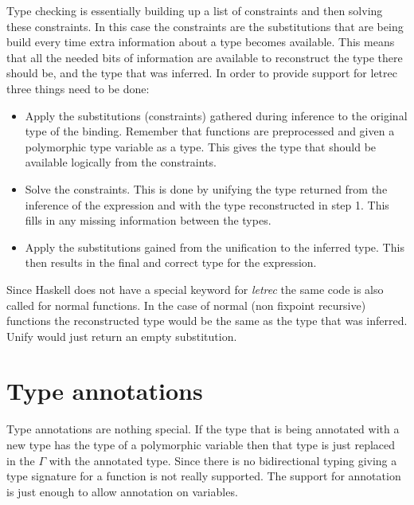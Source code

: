 Type checking is essentially building up a list of constraints and then solving these constraints. In this case the constraints are the substitutions that are being build every time extra information about a type becomes available.
This means that all the needed bits of information are available to reconstruct the type there should be, and the type that was inferred. In order to provide support for letrec three things need to be done:

\begin{itemize}
\item Apply the substitutions (constraints) gathered during inference to the original type of the binding. Remember that functions are preprocessed and given a polymorphic type variable as a type. This gives the type that should be available logically from the constraints.
\item Solve the constraints. This is done by unifying the type returned from the inference of the expression and with the type reconstructed in step 1. This fills in any missing information between the types.
\item Apply the substitutions gained from the unification to the inferred type. This then results in the final and correct type for the expression.
\end{itemize}
Since Haskell does not have a special keyword for \emph{letrec} the same code is also called for normal functions. In the case of normal (non fixpoint recursive) functions the reconstructed type would be the same as the type that was inferred. Unify would just return an empty substitution.

\section{Type annotations}
Type annotations are nothing special. If the type that is being annotated with a new type has the type of a polymorphic variable then that type is just replaced in the $\Gamma$ with the annotated type. Since there is no bidirectional typing giving a type signature for a function is not really supported. The support for annotation is just enough to allow annotation on variables.
